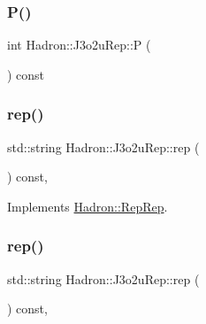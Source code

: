 \mbox{\label{structHadron_1_1J3o2uRep_a9e81ffb5181e3276f1e607a3fa90d62a}} 
\subsubsection{\texorpdfstring{P()}{P()}\hspace{0.1cm}{\footnotesize\ttfamily [2/2]}}
{\footnotesize\ttfamily int Hadron\+::\+J3o2u\+Rep\+::P (\begin{DoxyParamCaption}{ }\end{DoxyParamCaption}) const\hspace{0.3cm}{\ttfamily [inline]}}

\mbox{\label{structHadron_1_1J3o2uRep_aa8a4755a7dfd43ada92526d1e9a3c370}} 
\subsubsection{\texorpdfstring{rep()}{rep()}\hspace{0.1cm}{\footnotesize\ttfamily [1/2]}}
{\footnotesize\ttfamily std\+::string Hadron\+::\+J3o2u\+Rep\+::rep (\begin{DoxyParamCaption}{ }\end{DoxyParamCaption}) const\hspace{0.3cm}{\ttfamily [inline]}, {\ttfamily [virtual]}}



Implements \mbox{\hyperlink{structHadron_1_1RepRep_ab3213025f6de249f7095892109575fde}{Hadron\+::\+Rep\+Rep}}.

\mbox{\label{structHadron_1_1J3o2uRep_aa8a4755a7dfd43ada92526d1e9a3c370}} 
\subsubsection{\texorpdfstring{rep()}{rep()}\hspace{0.1cm}{\footnotesize\ttfamily [2/2]}}
{\footnotesize\ttfamily std\+::string Hadron\+::\+J3o2u\+Rep\+::rep (\begin{DoxyParamCaption}{ }\end{DoxyParamCaption}) const\hspace{0.3cm}{\ttfamily [inline]}, {\ttfamily [virtual]}}



